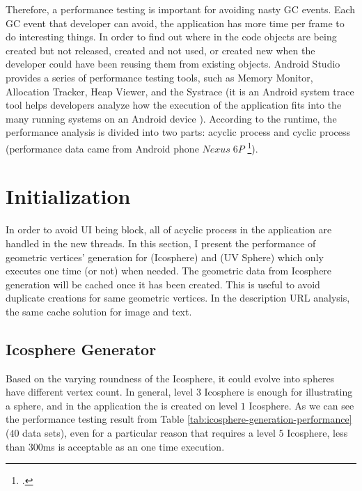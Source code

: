 Therefore, a performance testing is important for avoiding nasty GC events. Each GC event that developer can avoid, the application has more time per frame to do interesting things. In order to find out where in the code objects are being created but not released, created and not used, or created new when the developer could have been reusing them from existing objects. Android Studio provides a series of performance testing tools, such as Memory Monitor, Allocation Tracker, Heap Viewer, and the Systrace (it is an Android system trace tool helps developers analyze how the execution of the application fits into the many running systems on an Android device \cite{google.systrace.2016}). According to the runtime, the performance analysis is divided into two parts: acyclic process and cyclic process (performance data came from Android phone $Nexus\;6P$ \footcite{CPU: 2.0GHz octa-core, 64-bit ARM Cortex-A57 & ARM Cortex-A53, 8 cores; GPU: Adreno 430}).

\section{Initialization}

In order to avoid UI being block, all of acyclic process in the application are handled in the new threads. In this section, I present the performance of geometric vertices' generation for  (Icosphere) and  (UV Sphere) which only executes one time (or not) when needed. The geometric data from Icosphere generation will be cached once it has been created. This is useful to avoid duplicate creations for same geometric vertices. In the  description URL analysis, the same cache solution for image and text.

\subsection{Icosphere Generator}

Based on the varying roundness of the Icosphere, it could evolve into spheres have different vertex count. In general, level $3$ Icosphere is enough for illustrating a sphere, and in the application the  is created on level $1$ Icosphere. As we can see the performance testing result from Table \ref{tab:icosphere-generation-performance} ($40$ data sets), even for a particular reason that requires a level $5$ Icosphere, less than $300$ms is acceptable as an one time execution.

